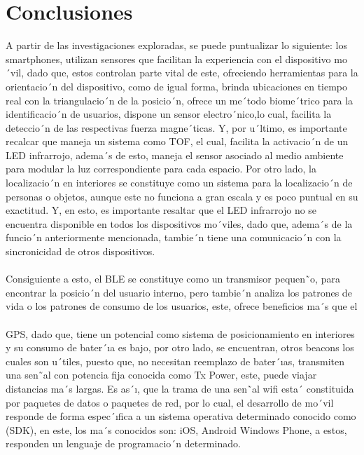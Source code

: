 \documentclass[conference,compsoc,onecolumn]{IEEEtran}
\begin{document}
\section{Conclusiones}
\label{sec:conclusions}
A partir de las investigaciones exploradas, se puede puntualizar lo siguiente: los smartphones, utilizan sensores que facilitan la experiencia con el dispositivo mo´vil, dado que, estos controlan parte vital de este, ofreciendo herramientas para la orientacio´n del dispositivo, como de igual forma, brinda ubicaciones en tiempo real con la triangulacio´n de la posicio´n, ofrece un me´todo biome´trico para la identificacio´n de usuarios, dispone un sensor electro´nico,lo cual, facilita la deteccio´n de  las  respectivas  fuerza  magne´ticas.  Y,  por  u´ltimo,  es  importante  recalcar  que  maneja  un  sistema  como  TOF,  el  cual, facilita  la  activacio´n  de  un  LED  infrarrojo,  adema´s  de  esto,  maneja  el  sensor  asociado  al  medio  ambiente  para  modular la  luz  correspondiente  para  cada  espacio.  Por  otro  lado,  la  localizacio´n  en  interiores  se  constituye  como  un  sistema  para la  localizacio´n  de  personas  o  objetos,  aunque  este  no  funciona  a  gran  escala  y  es  poco  puntual  en  su  exactitud.  Y,  en esto, es importante resaltar que el LED infrarrojo no se encuentra disponible en todos los dispositivos mo´viles, dado que, adema´s de la funcio´n anteriormente mencionada, tambie´n tiene una comunicacio´n con la sincronicidad de otros dispositivos.
\\
\\
Consiguiente a esto, el BLE se constituye como un transmisor pequen˜o, para encontrar la posicio´n del usuario interno, pero  tambie´n  analiza  los  patrones  de  vida  o  los  patrones  de  consumo  de  los  usuarios,  este,  ofrece  beneficios  ma´s  que  el
 \\
 \\
GPS, dado que, tiene un potencial como sistema de posicionamiento en interiores y su consumo de bater´ıa es bajo, por otro lado, se encuentran, otros beacons los cuales son u´tiles, puesto que, no necesitan reemplazo de bater´ıas, transmiten una sen˜al con potencia fija conocida como Tx Power, este, puede viajar distancias ma´s largas. Es as´ı, que la trama de una sen˜al wifi esta´  constituida por paquetes de datos o paquetes de red, por lo cual, el desarrollo de mo´vil responde de forma espec´ıfica a un sistema operativa determinado conocido como (SDK), en este, los ma´s conocidos son: iOS, Android   Windows Phone, a estos, responden un lenguaje de programacio´n determinado.
\end{document}

